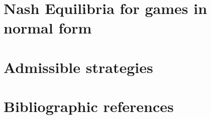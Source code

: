 \section{Nash Equilibria for games in normal form}
\label{13-sec:nash_equilibria_normal_form}


\section{Admissible strategies}
\label{13-sec:admissible_strategies}


\section*{Bibliographic references}
\label{13-sec:references}

